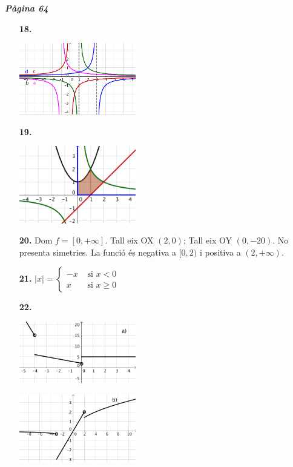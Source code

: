 \documentclass[a4paper, pdf, twoside]{book}
\begin{document}
\begin{multicols}{2}
{\textbf{\em Pàgina 64}} \hrulefill
\begin{enumerate}
\vspace{0.25cm}
\item[\fontfamily{phv}\selectfont\color{blue}\textbf{18. }] 
\mbox {}\par \includegraphics [width=0.4\textwidth ]{img-sol/t5-18}
 \end{enumerate}
\begin{enumerate}
\vspace{0.25cm}
\item[\fontfamily{phv}\selectfont\color{blue}\textbf{19. }] 
\mbox {}\par \includegraphics [width=0.4\textwidth ]{img-sol/t5-19}
\vspace{0.25cm}
\item[\fontfamily{phv}\selectfont\color{blue}\textbf{20. }] 
Dom $f=[0,+\infty ]$. Tall eix OX $(2,0)$; Tall eix OY $(0,-20)$. No presenta simetries. La funció és negativa a $[0,2)$ i positiva a $(2,+\infty )$.
\vspace{0.25cm}
\item[\fontfamily{phv}\selectfont\color{blue}\textbf{21. }] 
$|x|=\left \{ \begin {array}{ll} -x & \text { si } x<0 \\ x & \text { si } x\ge 0 \end {array} \right .$
\vspace{0.25cm}
\item[\fontfamily{phv}\selectfont\color{blue}\textbf{22. }] 
\mbox {}\par \includegraphics [width=0.4\textwidth ]{img-sol/t5-22a}\par \includegraphics [width=0.4\textwidth ]{img-sol/t5-22b}

\end{enumerate}
\end{multicols}
\end{document}
